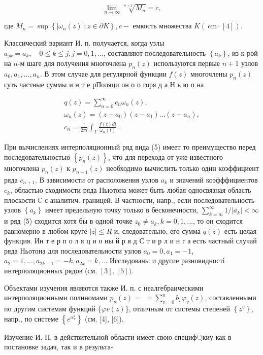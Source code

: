 \documentclass[10pt]{article}
\begin{document}
\[

\lim _{n \rightarrow \infty} \sqrt[n+1]{M_{n}}=c,

\]



где $M_{n}=\sup \left\{\left|\omega_{n}(z)\right| ; z \in \partial K\right\}, c-$ емкость множества $K(\mathrm{~cm} \cdot[4])$.



Классический вариант И. п. получается, когда узлы $a_{j k}=a_{k}, \quad 0 \leqslant k \leqslant j, j=0,1, \ldots$, составляют последовательность $\left\{a_{k}\right\}$, из к-рой на $n$-м шаге для получения многочлена $p_{n}(z)$ используются первые $n+1$ узлов $a_{0}, a_{1}, \ldots, a_{n}$. В этом случае для регулярной функции $f(z)$ многочлены $p_{n}(z)$ суть частные суммы и н т е рПоляци он о о горя д а Н ь ю о на



\[

\begin{gathered}

q(z)=\sum_{n=0}^{\infty} c_{n} \omega_{n}(z), \\

\omega_{n}(z)=\left(z-a_{0}\right)\left(z-a_{1}\right) \ldots\left(z-a_{n}\right), \\

c_{n}=\frac{1}{2 \pi i} \int_{\Gamma} \frac{f(t) d t}{\omega_{n}(t)} .

\end{gathered}

\]



При вычислениях интерполяционный ряд вида (5) имеет то преимущество перед последовательностью $\left\{p_{n}(z)\right\}$, что для перехода от уже известного многочлена $p_{n}(z)$ к $p_{n+1}(z)$ необходимо вычислить только один коэффициент ряда $c_{n+1}$. В зависимости от расположения узлов $a_{k}$ и значений коэфффициентов $c_{k}$, областью сходимости ряда Ньютона может быть любая односвязная область плоскости $\mathbb{C}$ с аналитич. границей. В частности, напр., если последовательность узлов $\left\{a_{k}\right\}$ имеет предельную точку только в бесконечности, $\sum_{k=m}^{\infty} 1 /\left|a_{k}\right|<\infty$ и ряд (5) сходится хотя бы в одной точке $z_{0} \neq a_{k}, k=0,1, \ldots$, то он сходится равномерно в любом круге $|z| \leqslant R$ и, следовательно, его сумма $q(z)$ есть целая функция. Ин т е р п о л я ц и о ны й р я д С т и р л и н г а есть частный случай ряда Ньотона для последовательности узлов $a_{0}=0, a_{1}=-1$, $a_{2}=1, \ldots, a_{2 k-1}=-k, a_{2 k}=k, \ldots$ Исследованы и другие разновидності интерполяционных рядов (см. $[3],[5])$.



Объектами изучения являются также И. п. с неалгебраическими интерполяционными полиномами $p_{n}(z)=$ $=\sum_{v=0}^{n} b_{v} \varphi_{v}(z)$, составленными по другим системам функций $\{\varphi v(z)\}$, отличным от системы степеней $\left\{z^{v}\right\}$, напр., по системе $\left\{e^{\alpha_{v}^{z}}\right\}$ (см. [4], [6]).



Изучение И. П. в действительной области имеет свою специф্киу как в постановке задач, так и в результа-
\end{document}

